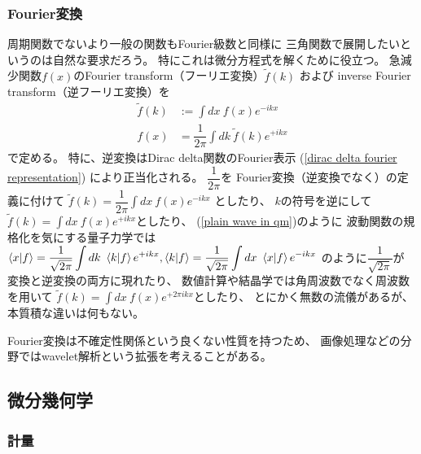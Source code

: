 \subsubsection{Fourier変換}

周期関数でないより一般の関数もFourier級数と同様に
三角関数で展開したいというのは自然な要求だろう。
特にこれは微分方程式を解くために役立つ。
急減少関数$f(x)$のFourier transform（フーリエ変換）$\tilde{f}(k)$
および
inverse Fourier transform（逆フーリエ変換）を
\begin{subequations}
\begin{align}
    \tilde{f}(k)
    &:=
    \int dx\ f(x) e^{-ikx}
\\
    f(x)
    &=
    \dfrac{1}{2\pi}\int dk\ 
    \tilde{f}(k) e^{+ikx}
\end{align}
\label{fourier transf}
\end{subequations}
で定める。
特に、逆変換はDirac delta関数のFourier表示
(\ref{dirac delta fourier representation})
により正当化される。
$\dfrac{1}{2\pi}$を
Fourier変換（逆変換でなく）の定義に付けて
$\displaystyle
\tilde{f}(k) = \dfrac{1}{2\pi}
\int dx\ f(x) e^{-ikx}$
としたり、
$k$の符号を逆にして
$\displaystyle
\tilde{f}(k) =
\int dx\ f(x) e^{+ikx}$としたり、
(\ref{plain wave in qm})のように
波動関数の規格化を気にする量子力学では
$\displaystyle
    \braket{ x | f }
    =
    \dfrac{1}{\sqrt{2\pi}}
    \int dk\ \braket{k | f} e^{+ikx}
    ,
    \braket{ k | f }
    =
    \dfrac{1}{\sqrt{2\pi}}
    \int dx\ \braket{x | f} e^{-ikx}
$
のように$\dfrac{1}{\sqrt{2\pi}}$が
変換と逆変換の両方に現れたり、
数値計算や結晶学では角周波数でなく周波数を用いて
$\displaystyle
\tilde{f}(k) =
\int dx\ f(x) e^{+2\pi ikx}$としたり、
とにかく無数の流儀があるが、本質積な違いは何もない。

Fourier変換は不確定性関係という良くない性質を持つため、
画像処理などの分野ではwavelet解析という拡張を考えることがある。

\newpage
\subsection{微分幾何学}

\subsubsection{計量}

